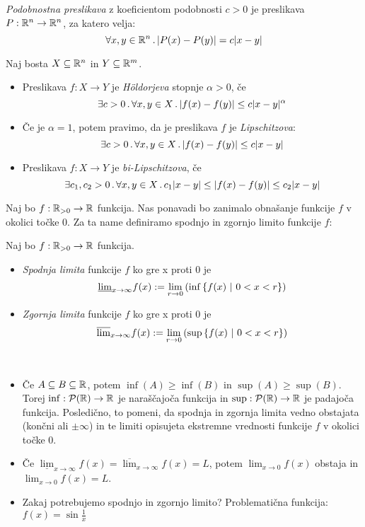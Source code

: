 \begin{definicija}
    \emph{Podobnostna preslikava} z koeficientom podobnosti \(c > 0\) je preslikava \(P: \mathbb{R}^n \to \mathbb{R}^n\), za katero velja:
    \[\forall x, y \in \mathbb{R}^n \,.\, |P(x) - P(y)| = c|x-y|\]
\end{definicija}

\begin{definicija} Naj bosta \(X \subseteq \mathbb{R}^n\) in \(Y \subseteq \mathbb{R}^m\).
    \begin{itemize}
        \item Preslikava \(f: X \to Y\) je \emph{Höldorjeva} stopnje \(\alpha > 0\), če
        \[\exists c > 0 \,.\, \forall x, y \in X \,.\, |f(x) -f(y)| \leq c|x-y|^\alpha\]
        \item Če je \(\alpha = 1\), potem pravimo, da je preslikava \(f\) je \emph{Lipschitzova}:
        \[\exists c > 0 \,.\, \forall x, y \in X \,.\, |f(x) -f(y)| \leq c|x-y|\]
        \item Preslikava \(f: X \to Y\) je \emph{bi-Lipschitzova}, če 
        \[\exists c_1, c_2 > 0 \,.\, \forall x, y \in X \,.\, c_1 |x- y| \leq |f(x) - f(y)| \leq c_2 |x - y|\]
    \end{itemize}    
\end{definicija}

Naj bo \(f: \mathbb{R}_{>0} \to \mathbb{R}\) funkcija. Nas ponavadi bo zanimalo obnašanje funkcije \(f\) v okolici točke \(0\). Za ta name definiramo spodnjo in zgornjo limito funkcije \(f\):
\begin{definicija}
    Naj bo \(f: \mathbb{R}_{>0} \to \mathbb{R}\) funkcija. 
    \begin{itemize}
        \item \emph{Spodnja limita} funkcije \(f\) ko gre x proti \(0\) je 
        \[\underline{\lim}_{x \to \infty} f(x) := \lim_{r \to 0} \left(\inf \left\{f(x) \ | \ 0< x < r\right\}\right)\]
        \item \emph{Zgornja limita} funkcije \(f\) ko gre x proti \(0\) je 
        \[\overline{\lim}_{x \to \infty} f(x) := \lim_{r \to 0} \left(\sup \left\{f(x) \ | \ 0< x < r\right\}\right)\]
    \end{itemize}
\end{definicija}

\begin{opomba} \
    \begin{itemize}
        \item Če \(A \subseteq B \subseteq \mathbb{R}\), potem \(\inf(A) \geq \inf(B)\) in \(\sup(A) \geq \sup(B)\). Torej \(\inf: \mathcal{P}(\mathbb{R}) \to \mathbb{R}\) je naraščajoča funkcija in \(\sup: \mathcal{P}(\mathbb{R}) \to \mathbb{R}\) je padajoča funkcija. Posledično, to pomeni, da spodnja in zgornja limita vedno obstajata (končni ali \(\pm \infty\)) in te limiti opisujeta ekstremne vrednosti funkcije \(f\) v okolici točke \(0\).
        \item Če \(\underline{\lim}_{x \to \infty} f(x) = \overline{\lim}_{x \to \infty} f(x) = L\), potem \(\lim_{x \to 0} f(x)\) obstaja in \(\lim_{x \to 0} f(x) = L\).
        \item Zakaj potrebujemo spodnjo in zgornjo limito? Problematična funkcija: \(f(x) = \sin \frac{1}{x}\)
    \end{itemize}
\end{opomba}

